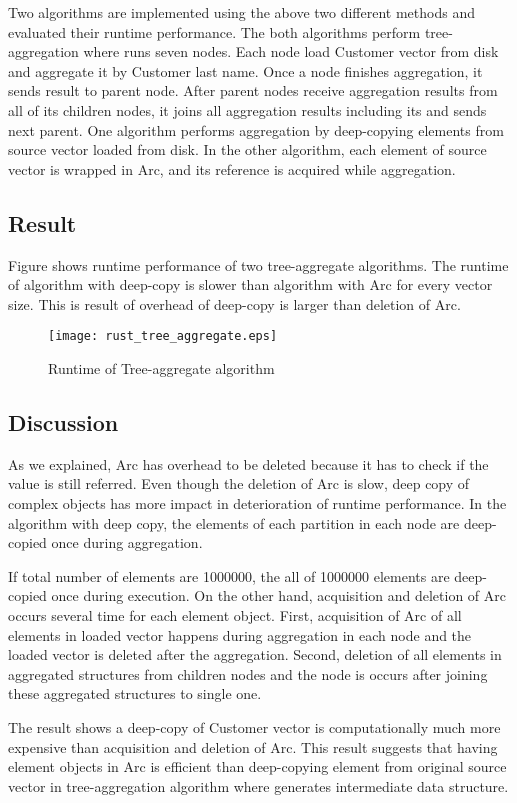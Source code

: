 Two algorithms are implemented using the above two different methods and evaluated their runtime performance. 
The both algorithms perform tree-aggregation where runs seven nodes. 
Each node load Customer vector from disk and aggregate it by Customer last name. Once a node finishes aggregation, it sends result to parent node. 
After parent nodes receive aggregation results from all of its children nodes, it joins all aggregation results including its and sends next parent. 
One algorithm performs aggregation by deep-copying elements from source vector loaded from disk. In the other algorithm, each element of source vector 
is wrapped in Arc, and its reference is acquired while aggregation. 


\subsection{Result}

Figure shows runtime performance of two tree-aggregate algorithms. The runtime of algorithm with deep-copy is slower than algorithm with Arc for every vector size. 
This is result of overhead of deep-copy is larger than deletion of Arc. 

\begin{figure}[htb]
    \texttt{[image: rust\_tree\_aggregate.eps]}
    \caption{Runtime of Tree-aggregate algorithm}
    \label{fig:Sampling}
\end{figure}

\subsection{Discussion}
As we explained, Arc has overhead to be deleted because it has to check if the value is still referred. 
Even though the deletion of Arc is slow, deep copy of complex objects has more impact in deterioration of runtime performance. 
In the algorithm with deep copy, the elements of each partition in each node are deep-copied once during aggregation. 

If total number of elements are 1000000, the all of 1000000 elements are deep-copied once during execution. On the other hand, acquisition and deletion of Arc occurs several time for each element object.
First, acquisition of Arc of all elements in loaded vector happens during aggregation in each node and the loaded vector is deleted after the aggregation. 
Second, deletion of all elements in aggregated structures from children nodes and the node is occurs after joining these aggregated structures to single one. 

The result shows a deep-copy of Customer vector is computationally much more expensive than acquisition and deletion of Arc. 
This result suggests that having element objects in Arc is efficient than deep-copying element from original source vector in tree-aggregation algorithm 
where generates intermediate data structure. 